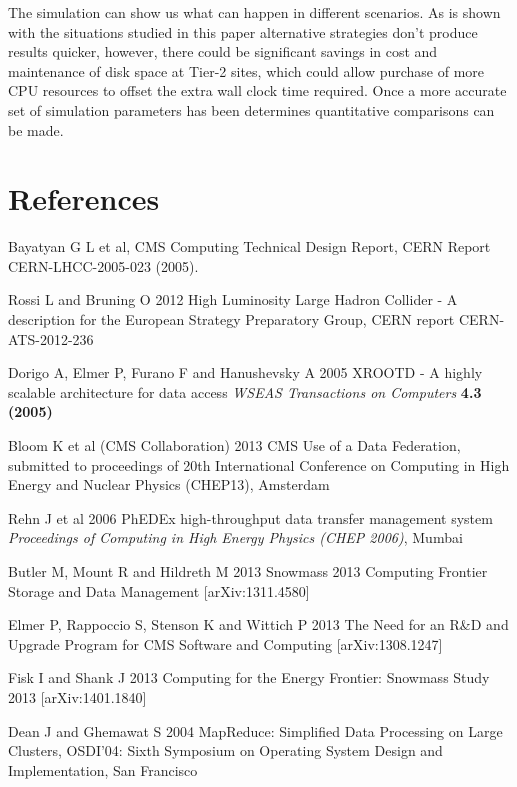 \documentclass[a4paper]{jpconf}
\begin{document}
The simulation can show us what can happen in different scenarios. As
is shown with the situations studied in this paper alternative
strategies don't produce results quicker, however, there could be
significant savings in cost and maintenance of disk space at Tier-2
sites, which could allow purchase of more CPU resources to offset the
extra wall clock time required. Once a more accurate set of simulation
parameters has been determines quantitative comparisons can be made.

\section*{References}
\begin{thebibliography}{9}
 Bayatyan G L et al,  CMS Computing Technical Design
  Report, CERN Report CERN-LHCC-2005-023 (2005).

 Rossi L and Bruning O 2012 High Luminosity Large Hadron
  Collider - A description for the European Strategy Preparatory
  Group, CERN report CERN-ATS-2012-236

 Dorigo A, Elmer P, Furano F and Hanushevsky A 2005
  XROOTD - A highly scalable architecture for data access {\it WSEAS
    Transactions on Computers} {\bf 4.3 (2005)}

 Bloom K et al (CMS Collaboration) 2013 CMS Use of
  a Data Federation, submitted to proceedings of 20th International
  Conference on Computing in High Energy and Nuclear Physics (CHEP13),
  Amsterdam

 Rehn J et al 2006 PhEDEx high-throughput data
  transfer management system {\it Proceedings of Computing in High
    Energy Physics (CHEP 2006)}, Mumbai

 Butler M, Mount R and Hildreth M 2013 Snowmass
  2013 Computing Frontier Storage and Data Management
  [arXiv:1311.4580]

 Elmer P, Rappoccio S, Stenson K and Wittich P 2013
  The Need for an R\&D and Upgrade Program for CMS Software and
  Computing [arXiv:1308.1247]

 Fisk I and Shank J 2013 Computing for the Energy
  Frontier: Snowmass Study 2013 [arXiv:1401.1840]

 Dean J and Ghemawat S 2004 MapReduce: Simplified Data Processing on Large Clusters, OSDI'04: Sixth Symposium on Operating System Design
and Implementation, San Francisco

\end{thebibliography}
\end{document}
